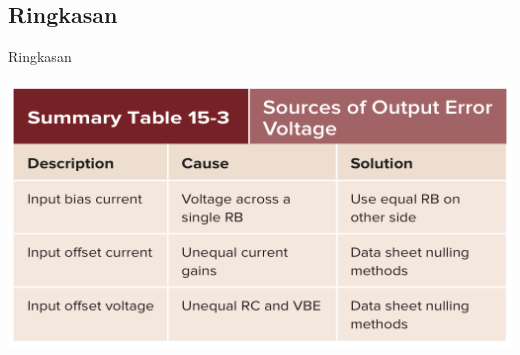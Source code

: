\documentclass[aspectratio=169]{beamer}
\begin{document}
\subsection{Ringkasan}
\begin{frame}{Ringkasan}
	\begin{center}
		\includegraphics[height=0.7\textheight]{gambar/01.ringkasan_3}
	\end{center}
\end{frame}
\end{document}
